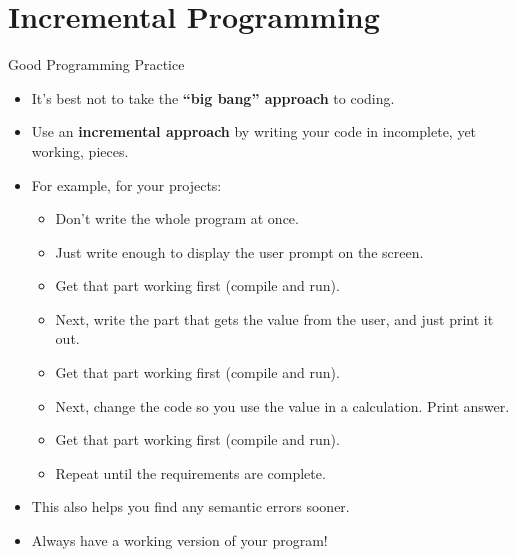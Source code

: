 \documentclass[graphics]{beamer}
\begin{document}
\section*{Incremental Programming}\label{sec:incprog}
\begin{frame}{Good Programming Practice}
    \begin{itemize}
        \item It's best not to take the \textbf{``big bang'' approach} to coding.
        \item Use an \textbf{incremental approach} by writing your code in incomplete, yet working, pieces.
        \item For example, for your projects:
        \begin{itemize}
            \item Don't write the whole program at once.
            \item Just write enough to display the user prompt on the screen.
            \item Get that part working first (compile and run).
            \item Next, write the part that gets the value from the user, and just print it out.
            \item Get that part working first (compile and run).
            \item Next, change the code so you use the value in a calculation. Print answer.
            \item Get that part working first (compile and run).
            \item Repeat until the requirements are complete.
        \end{itemize}
        \item This also helps you find any semantic errors sooner.
        \item Always have a working version of your program!
    \end{itemize}
\end{frame}
\end{document}
